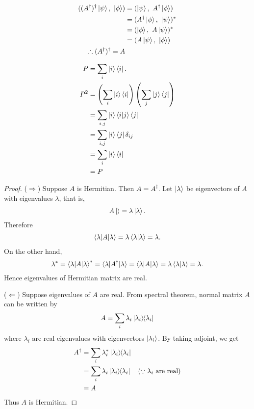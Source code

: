\begin{align*}
	((A^\dagger)^\dagger\ket{\psi},\ \ket{\phi} )
	&= (\ket{\psi},\ A^\dagger \ket{\phi})\\
	&= (A^\dagger \ket{\phi},\ \ket{\psi})^*\\
	&= (\ket{\phi},\ A\ket{\psi})^*\\
	&= (A\ket{\psi},\ \ket{\phi})\\
	\therefore (A^\dagger)^\dagger = A
\end{align*}


\begin{align*}
	P &= \sum_i \ket{i}\bra{i}.\\
	P^2 &= \left(\sum_i \ket{i}\bra{i}\right) \left(\sum_j \ket{j}\bra{j}\right)\\
	&= \sum_{i,j} \ket{i}\braket{i | j}\bra{j}\\
	&= \sum_{i,j} \ket{i}\bra{j} \delta_{ij}\\
	&= \sum_i \ket{i}\bra{i}\\
	&= P
\end{align*}


\begin{proof}
	($\Rightarrow$) Suppose $A$ is Hermitian. Then $A=A^\dagger$.
	Let $\ket{\lambda}$ be eigenvectors of $A$ with eigenvalues $\lambda$, that is,
	\begin{align*}
		A \ket{\label{text}} = \lambda \ket{\lambda}.
	\end{align*}
	Therefore
	\begin{align*}
		\braket{\lambda | A | \lambda} = \lambda \braket{\lambda | \lambda} = \lambda.
	\end{align*}
	On the other hand,
	\begin{align*}
		\lambda^*  = \braket{\lambda | A | \lambda}^*
								= \braket{\lambda | A^\dagger |  \lambda}
								= \braket{\lambda | A | \lambda}
								= \lambda \braket{\lambda | \lambda} = \lambda.
	\end{align*}
	Hence eigenvalues of Hermitian matrix are real.

	($\Leftarrow$) Suppose eigenvalues of $A$ are real. From spectral theorem, normal matrix $A$ can be written by
	\begin{align}
		A= \sum_i \lambda_i \ket{\lambda_i}\hspace{-1mm} \bra{\lambda_i}
	\end{align}
	where $\lambda_i$ are  real eigenvalues with eigenvectors $\ket{\lambda_i}$.
	By taking adjoint, we get
	\begin{align*}
		A^\dagger &= \sum_i \lambda_i^* \ket{\lambda_i}\hspace{-1mm} \bra{\lambda_i}\\
								&= \sum_i \lambda_i \ket{\lambda_i}\hspace{-1mm} \bra{\lambda_i}~~~(\because \lambda_i \text{ are real})\\
								&= A
	\end{align*}
	Thus $A$ is Hermitian.
\end{proof}

